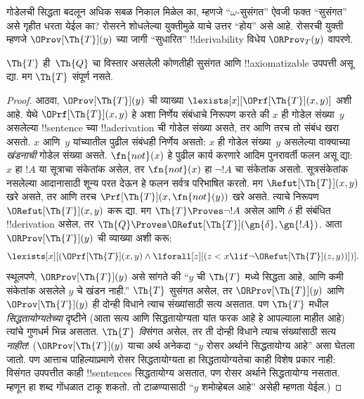 \documentclass[../../../include/open-logic-section]{subfiles}
\begin{document}


गोडेलची सिद्धता बदलून अधिक सबळ निकाल मिळेल का,
म्हणजे “$\omega$-सुसंगत” ऐवजी फक्त
“सुसंगत” असे गृहीत धरता येईल का?
रोसरने शोधलेल्या युक्तीमुळे याचे उत्तर
“होय” असे आहे. रोसरची युक्ती म्हणजे
$\OProv[\Th{T}](y)$ च्या जागी
“सुधारित” !!{derivability} विधेय
$\ORProv_T(y)$ वापरणे.

\begin{thm}
$\Th{T}$ ही~$\Th{Q}$ चा विस्तार
असलेली कोणतीही सुसंगत आणि
!!{axiomatizable} उपपत्ती असू द्या.
मग $\Th{T}$ संपूर्ण नसते.
\end{thm}

\begin{proof}
आठवा, $\OProv[\Th{T}](y)$ ची व्याख्या
$\lexists[x][\OPrf[\Th{T}](x,
  y)]$ अशी आहे. येथे
$\OPrf[\Th{T}](x, y)$ हे अशा निर्णेय
संबंधाचे निरूपण करते की $x$ ही
गोडेल संख्या~$y$ असलेल्या
!!{sentence} च्या !!a{derivation}
ची गोडेल संख्या असते, तर आणि तरच तो
संबंध खरा असतो. $x$ आणि~$y$
यांच्यातील पुढील संबंधही निर्णेय
असतो: $x$ ही गोडेल
संख्या~$y$ असलेल्या वाक्याच्या
\emph{खंडनाची} गोडेल संख्या असते.
$\fn{not}(x)$ हे पुढील कार्य
करणारे आदिम पुनरावर्ती फलन
असू द्या: $x$ हा $!A$ या
सूत्राचा संकेतांक असेल, तर
$\fn{not}(x)$ हा $\lnot
!A$ चा संकेतांक असतो. सूत्रसंकेतांक नसलेल्या
आदानासाठी शून्य परत देऊन हे फलन सर्वत्र परिभाषित करतो. मग
$\Refut[\Th{T}](x, y)$
खरे असते, तर आणि तरच
$\Prf[\Th{T}](x, \fn{not}(y))$
खरे असते. त्याचे निरूपण
$\ORefut[\Th{T}](x, y)$
करू द्या. मग
$\Th{T} \Proves \lnot !A$
असेल आणि $\delta$ ही
संबंधित !!{derivation} असेल,
तर $\Th{Q} \Proves
\ORefut[\Th{T}](\gn{\delta}, \gn{!A})$.
आता $\ORProv[\Th{T}](y)$ ची
व्याख्या अशी करू:
\[
\lexists[x][(\OPrf[\Th{T}](x,y) \land \lforall[z][(z < x \lif \lnot
  \ORefut[\Th{T}](z,y))])].
\]
स्थूलपणे, $\ORProv[\Th{T}](y)$
असे सांगते की “$y$ ची
$\Th{T}$ मध्ये सिद्धता आहे,
आणि कमी संकेतांक असलेले
$y$ चे खंडन नाही.”
$\Th{T}$ सुसंगत असेल,
तर $\ORProv[\Th{T}](y)$ आणि
$\OProv[\Th{T}](y)$ ही दोन्ही
विधाने त्याच संख्यांसाठी
सत्य असतात. पण $\Th{T}$
मधील \emph{सिद्धतायोग्यतेच्या}
दृष्टीने (आता सत्य आणि
सिद्धतायोग्यता यांत फरक आहे
हे आपल्याला माहीत आहे)
त्यांचे गुणधर्म भिन्न असतात.
$\Th{T}$ \emph{वि}संगत
असेल, तर ती दोन्ही विधाने
त्याच संख्यांसाठी सत्य
\emph{नाहीत}!{}
($\ORProv[\Th{T}](y)$
याचा अर्थ अनेकदा “$y$ रोसर
अर्थाने सिद्धतायोग्य आहे”
असा घेतला जातो. पण आत्ताच
पाहिल्याप्रमाणे रोसर
सिद्धतायोग्यता हा
सिद्धतायोग्यतेचा काही
विशेष प्रकार नाही:
विसंगत उपपत्तीत काही
!!{sentence}s सिद्धतायोग्य
असतात, पण रोसर अर्थाने
सिद्धतायोग्य नसतात.
म्हणून हा शब्द गोंधळात
टाकू शकतो. तो टाळण्यासाठी
“$y$ शमोव्हेबल आहे”
असेही म्हणता येईल.)


\end{proof}
\end{document}
